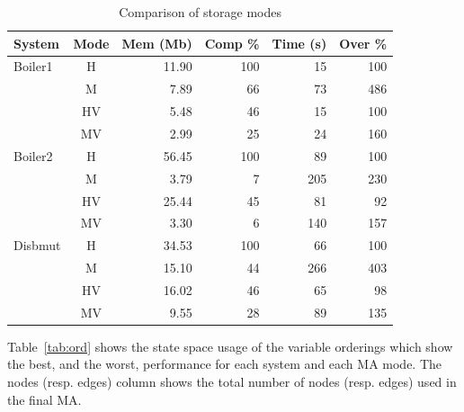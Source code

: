 \begin{table}
\begin{center}
\begin{tabular}{|l|c|r|r|r|r|}
\hline
\bf System & \bf Mode & \bf Mem (Mb) & \bf Comp \% & \bf Time (s) & \bf Over \% \\
\hline
Boiler1    & H        & 11.90        & 100         &  15          & 100  \\
           & M        &  7.89        &  66         &  73          & 486 \\
           & HV       &  5.48        &  46         &  15          & 100  \\
           & MV       &  2.99        &  25         &  24          & 160  \\   
\hline
Boiler2    & H        & 56.45        & 100         &  89          & 100 \\
           & M        &  3.79        &   7         & 205          & 230 \\
           & HV       & 25.44        &  45         &  81          &  92 \\
           & MV       &  3.30        &   6         & 140          & 157 \\
\hline
Disbmut    & H        & 34.53        & 100         &  66          & 100 \\
           & M        & 15.10        &  44         & 266          & 403 \\
           & HV       & 16.02        &  46         &  65          &  98 \\
           & MV       &  9.55        &  28         &  89          & 135 \\
\hline           
\end{tabular}
\end{center}
\caption{Comparison of storage modes \label{tab:comp}}
\end{table}

Table~\ref{tab:ord} shows the state space usage of the variable orderings which
show the best, and the worst, performance for each system and each MA
mode. The nodes (resp. edges) column shows the total number of nodes
(resp. edges) used in the final MA.
   

